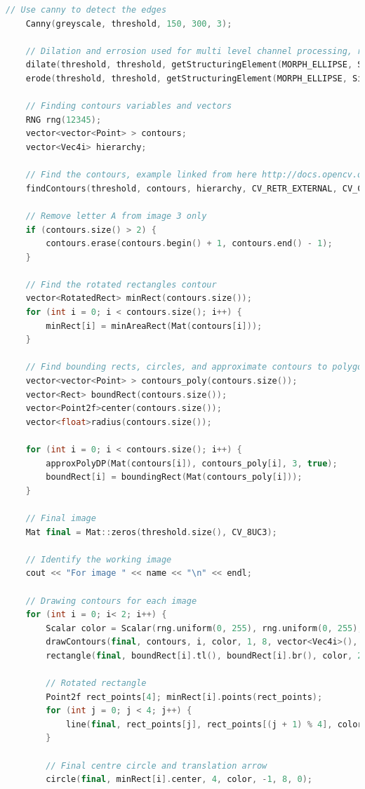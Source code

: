 \documentclass[a4paper, 10pt]{article}
\begin{document}
\begin{lstlisting}[language = C++]
	// Use canny to detect the edges
	Canny(greyscale, threshold, 150, 300, 3);
	
	// Dilation and errosion used for multi level channel processing, reduced noise
	dilate(threshold, threshold, getStructuringElement(MORPH_ELLIPSE, Size(5, 5)));
	erode(threshold, threshold, getStructuringElement(MORPH_ELLIPSE, Size(5, 5)));

	// Finding contours variables and vectors
	RNG rng(12345);
	vector<vector<Point> > contours;
	vector<Vec4i> hierarchy;
	
	// Find the contours, example linked from here http://docs.opencv.org/2.4/doc/tutorials/imgproc/shapedescriptors/find_contours/find_contours.html
	findContours(threshold, contours, hierarchy, CV_RETR_EXTERNAL, CV_CHAIN_APPROX_NONE, Point(0, 0));
	
	// Remove letter A from image 3 only
	if (contours.size() > 2) {
		contours.erase(contours.begin() + 1, contours.end() - 1);
	}

	// Find the rotated rectangles contour
	vector<RotatedRect> minRect(contours.size());
	for (int i = 0; i < contours.size(); i++) {
		minRect[i] = minAreaRect(Mat(contours[i]));
	}

	// Find bounding rects, circles, and approximate contours to polygons
	vector<vector<Point> > contours_poly(contours.size());
	vector<Rect> boundRect(contours.size());
	vector<Point2f>center(contours.size());
	vector<float>radius(contours.size());

	for (int i = 0; i < contours.size(); i++) {
		approxPolyDP(Mat(contours[i]), contours_poly[i], 3, true);
		boundRect[i] = boundingRect(Mat(contours_poly[i]));
	}

	// Final image
	Mat final = Mat::zeros(threshold.size(), CV_8UC3);
	
	// Identify the working image
	cout << "For image " << name << "\n" << endl;
	
	// Drawing contours for each image
	for (int i = 0; i< 2; i++) {
		Scalar color = Scalar(rng.uniform(0, 255), rng.uniform(0, 255), rng.uniform(0, 255));
		drawContours(final, contours, i, color, 1, 8, vector<Vec4i>(), 0, Point());
		rectangle(final, boundRect[i].tl(), boundRect[i].br(), color, 2, 8, 0);

		// Rotated rectangle
		Point2f rect_points[4]; minRect[i].points(rect_points);
		for (int j = 0; j < 4; j++) {
			line(final, rect_points[j], rect_points[(j + 1) % 4], color, 1, 8);
		}
		
		// Final centre circle and translation arrow
		circle(final, minRect[i].center, 4, color, -1, 8, 0);
		

\end{lstlisting}
\end{document}
